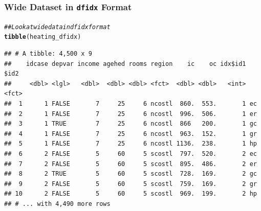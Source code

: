 \documentclass{beamer}\usepackage[]{graphicx}\usepackage[]{color}
\makeatletter
\newcommand{\hlcom}[1]{\textcolor[rgb]{0.678,0.584,0.686}{\textit{#1}}}%
\newcommand{\hlstd}[1]{\textcolor[rgb]{0.345,0.345,0.345}{#1}}%
\newcommand{\hlkwd}[1]{\textcolor[rgb]{0.737,0.353,0.396}{\textbf{#1}}}%
\newenvironment{kframe}{%
 \def\at@end@of@kframe{}%
 \ifinner\ifhmode%
  \def\at@end@of@kframe{\end{minipage}}%
  \begin{minipage}{\columnwidth}%
 \fi\fi%
 \def\FrameCommand##1{\hskip\@totalleftmargin \hskip-\fboxsep
 \colorbox{shadecolor}{##1}\hskip-\fboxsep
     \hskip-\linewidth \hskip-\@totalleftmargin \hskip\columnwidth}%
 \MakeFramed {\advance\hsize-\width
   \@totalleftmargin\z@ \linewidth\hsize
   \@setminipage}}%
 {\par\unskip\endMakeFramed%
 \at@end@of@kframe}
\newenvironment{knitrout}{}{} %
\makeatother
\begin{document}
\begin{frame}[fragile]\frametitle{Wide Dataset in \texttt{dfidx} Format}
\begin{knitrout}\footnotesize
{}\color{fgcolor}\begin{kframe}
\begin{alltt}
\hlcom{## Look at wide data in dfidx format}
\hlkwd{tibble}\hlstd{(heating_dfidx)}
\end{alltt}
\begin{verbatim}
## # A tibble: 4,500 x 9
##    idcase depvar income agehed rooms region    ic    oc idx$id1 $id2 
##     <dbl> <lgl>   <dbl>  <dbl> <dbl> <fct>  <dbl> <dbl>   <int> <fct>
##  1      1 FALSE       7     25     6 ncostl  860.  553.       1 ec   
##  2      1 FALSE       7     25     6 ncostl  996.  506.       1 er   
##  3      1 TRUE        7     25     6 ncostl  866   200.       1 gc   
##  4      1 FALSE       7     25     6 ncostl  963.  152.       1 gr   
##  5      1 FALSE       7     25     6 ncostl 1136.  238.       1 hp   
##  6      2 FALSE       5     60     5 scostl  797.  520.       2 ec   
##  7      2 FALSE       5     60     5 scostl  895.  486.       2 er   
##  8      2 TRUE        5     60     5 scostl  728.  169.       2 gc   
##  9      2 FALSE       5     60     5 scostl  759.  169.       2 gr   
## 10      2 FALSE       5     60     5 scostl  969.  199.       2 hp   
## # ... with 4,490 more rows
\end{verbatim}
\end{kframe}
\end{knitrout}
\end{frame}
\end{document}
